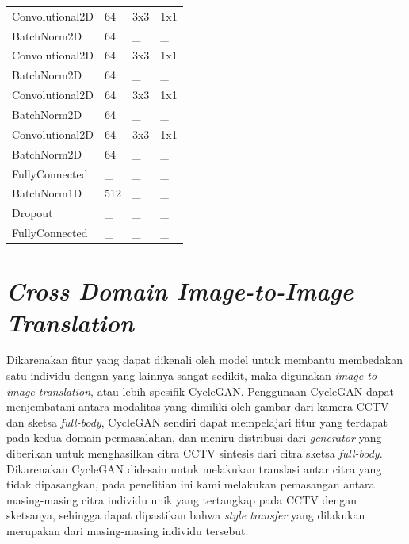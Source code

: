 \begin{center}
\begin{longtable}{|l|l|l|l|}
		Convolutional2D & 64 & 3x3 & 1x1 \\
		BatchNorm2D & 64 & \_ & \_ \\
		Convolutional2D & 64 & 3x3 & 1x1 \\
		BatchNorm2D & 64 & \_ & \_ \\
		Convolutional2D & 64 & 3x3 & 1x1 \\
		BatchNorm2D & 64 & \_ & \_ \\
		Convolutional2D & 64 & 3x3 & 1x1 \\
		BatchNorm2D & 64 & \_ & \_ \\
		FullyConnected & \_ & \_ & \_ \\
		BatchNorm1D & 512 & \_ & \_ \\
		Dropout & \_ & \_ & \_ \\
		FullyConnected & \_ & \_ & \_ \\
	\end{longtable}
\end{center}


\section{\textit{Cross Domain Image-to-Image Translation}}
\vspace{1ex}
Dikarenakan fitur yang dapat dikenali oleh model untuk membantu membedakan satu individu dengan yang lainnya sangat sedikit, maka digunakan \textit{image-to-image translation}, atau lebih spesifik CycleGAN. Penggunaan CycleGAN dapat menjembatani antara modalitas yang dimiliki oleh gambar dari kamera CCTV dan sketsa \textit{full-body}, CycleGAN sendiri dapat mempelajari fitur yang terdapat pada kedua domain permasalahan, dan meniru distribusi dari \textit{generator} yang diberikan untuk menghasilkan citra CCTV sintesis dari citra sketsa \textit{full-body}. Dikarenakan CycleGAN didesain untuk melakukan translasi antar citra yang tidak dipasangkan, pada penelitian ini kami melakukan pemasangan antara masing-masing citra individu unik yang tertangkap pada CCTV dengan sketsanya, sehingga dapat dipastikan bahwa \textit{style transfer} yang dilakukan merupakan dari masing-masing individu tersebut.

